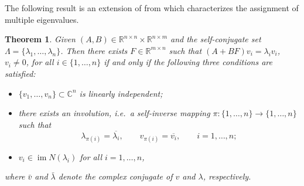 \documentclass[11pt]{article}
\theoremstyle{plain}
\newtheorem{theorem}{Theorem}
\theoremstyle{definition}
\theoremstyle{remark}
\begin{document}
The following result is an extension of \cite{Moore76} from \cite{KleinMoore77} which characterizes the assignment of multiple eigenvalues.
\begin{theorem}
\label{thm:moore}
Given $(A,B)\in \mathbb R^{n\times n}\times \mathbb R^{n\times m}$ and the self-conjugate set $\Lambda=\{\lambda_1,\dots,\lambda_n\}$. Then there exists $F\in \mathbb R^{m\times n}$ such that $(A+BF)v_i = \lambda_i v_i$, $v_i\neq 0$, for all $i\in\{1,\dots, n\}$ if and only if the following three conditions are satisfied:
\begin{itemize}
    \item[\rm (i)] $\{v_1,\dots, v_n\}\subset \mathbb C^{n}$ is linearly independent;
    \item[\rm (ii)] there exists an involution, i.e.\ a self-inverse mapping
$\pi:\{1,\ldots,n\}\to\{1,\ldots,n\}$ such that
\[
    \lambda_{\pi(i)}=\overline{\lambda_i},
    \qquad
    v_{\pi(i)}=\overline{v_i},
    \qquad i=1,\ldots,n;
\]
    \item[\rm (iii)] $v_i\in \operatorname{im} N(\lambda_i)$ for all $i=1,\ldots,n$,
\end{itemize}
where $\bar v$ and $\bar \lambda$ denote the complex conjugate of $v$ and $\lambda$, respectively.
\end{theorem}
\end{document}
